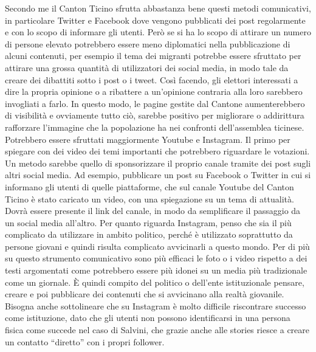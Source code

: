 Secondo me il Canton Ticino sfrutta abbastanza bene questi metodi comunicativi, in particolare Twitter e Facebook dove vengono pubblicati dei post regolarmente e con lo scopo di informare gli utenti. Però se si ha lo scopo di attirare un numero di persone elevato potrebbero essere meno diplomatici nella pubblicazione di alcuni contenuti, per esempio il tema dei migranti potrebbe essere sfruttato per attirare una grossa quantità di utilizzatori dei social media, in modo tale da creare dei dibattiti sotto i post o i tweet. Così facendo, gli elettori interessati a dire la propria opinione o a ribattere a un’opinione contraria alla loro sarebbero invogliati a farlo. In questo modo, le pagine gestite dal Cantone aumenterebbero di visibilità e ovviamente tutto ciò, sarebbe positivo per migliorare o addirittura rafforzare l’immagine che la popolazione ha nei confronti dell’assemblea ticinese. Potrebbero essere sfruttati maggiormente Youtube e Instagram. Il primo per spiegare con dei video dei temi importanti che potrebbero riguardare le votazioni. Un metodo sarebbe quello di sponsorizzare il proprio canale tramite dei post sugli altri social media. Ad esempio, pubblicare un post su Facebook o Twitter in cui si informano gli utenti di quelle piattaforme, che sul canale Youtube del Canton Ticino è stato caricato un video, con una spiegazione su un tema di attualità. Dovrà essere presente il link del canale, in modo da semplificare il passaggio da un social media all’altro. Per quanto riguarda Instagram, penso che sia il più complicato da utilizzare in ambito politico, perché è utilizzato soprattutto da persone giovani e quindi risulta complicato avvicinarli a questo mondo. Per di più su questo strumento comunicativo sono più efficaci le foto o i video rispetto a dei testi argomentati come potrebbero essere più idonei su un media più tradizionale come un giornale. È quindi compito del politico o dell’ente istituzionale pensare, creare e poi pubblicare dei contenuti che si avvicinano alla realtà giovanile. Bisogna anche sottolineare che su Instagram è molto difficile riscontrare successo come istituzione, dato che gli utenti non possono identificarsi in una persona fisica come succede nel caso di Salvini, che grazie anche alle stories riesce a creare un contatto “diretto” con i propri follower.

